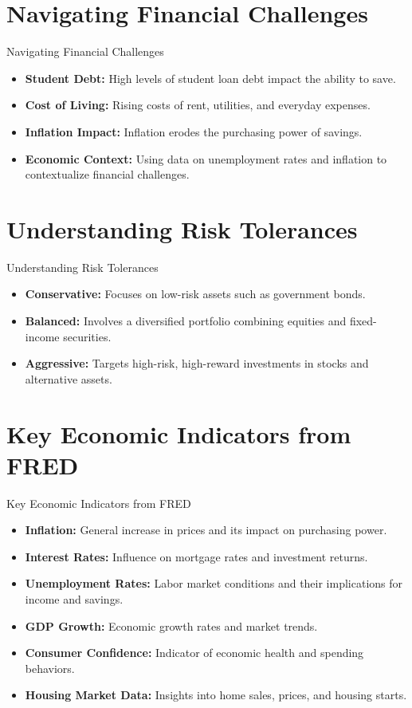 \documentclass{beamer}
\begin{document}
\section{Navigating Financial Challenges}
\begin{frame}{Navigating Financial Challenges}
    \begin{itemize}
        \item \textbf{Student Debt:} High levels of student loan debt impact the ability to save.
        \item \textbf{Cost of Living:} Rising costs of rent, utilities, and everyday expenses.
        \item \textbf{Inflation Impact:} Inflation erodes the purchasing power of savings.
        \item \textbf{Economic Context:} Using data on unemployment rates and inflation to contextualize financial challenges.
    \end{itemize}
\end{frame}

\section{Understanding Risk Tolerances}
\begin{frame}{Understanding Risk Tolerances}
    \begin{itemize}
        \item \textbf{Conservative:} Focuses on low-risk assets such as government bonds.
        \item \textbf{Balanced:} Involves a diversified portfolio combining equities and fixed-income securities.
        \item \textbf{Aggressive:} Targets high-risk, high-reward investments in stocks and alternative assets.
    \end{itemize}
\end{frame}

\section{Key Economic Indicators from FRED}
\begin{frame}{Key Economic Indicators from FRED}
    \begin{itemize}
        \item \textbf{Inflation:} General increase in prices and its impact on purchasing power.
        \item \textbf{Interest Rates:} Influence on mortgage rates and investment returns.
        \item \textbf{Unemployment Rates:} Labor market conditions and their implications for income and savings.
        \item \textbf{GDP Growth:} Economic growth rates and market trends.
        \item \textbf{Consumer Confidence:} Indicator of economic health and spending behaviors.
        \item \textbf{Housing Market Data:} Insights into home sales, prices, and housing starts.
    \end{itemize}
\end{frame}
\end{document}
